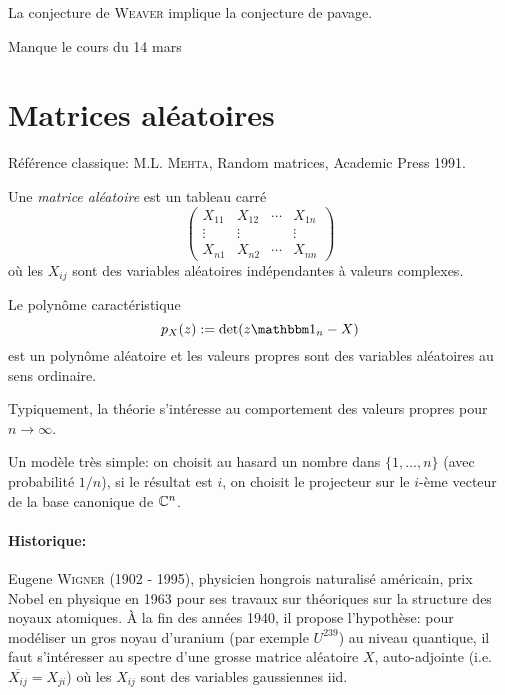 \begin{prop}
  La conjecture de \textsc{Weaver} implique la conjecture de pavage.
\end{prop}



{\LARGE Manque le cours du 14 mars}


\section{Matrices aléatoires}
\label{sec:matrices-aleatoires}

Référence classique: M.L. \textsc{Mehta}, Random matrices, Academic Press 1991.

\begin{defi}
  Une \emph{matrice aléatoire} est un tableau carré 
  \[ \begin{pmatrix}
      X_{11} & X_{12} & \cdots & X_{1n} \\
      \vdots & \vdots & & \vdots  \\
      X_{n1} & X_{n2} & \cdots & X_{nn}
    \end{pmatrix} \]
  où les $X_{ij}$ sont des variables aléatoires indépendantes à valeurs complexes.

  Le polynôme caractéristique 
  \[ p_X(z) := \det(z \un_n - X) \]
  est un polynôme aléatoire et les valeurs propres sont des variables aléatoires au sens ordinaire.
\end{defi}

Typiquement, la théorie s'intéresse au comportement des valeurs propres pour $n \to \infty$.


\begin{ex}
Un modèle très simple: on choisit au hasard un nombre dans $\{1, \ldots, n\}$ (avec probabilité $1/n$), si le
résultat est $i$, on choisit le projecteur sur le $i$-ème vecteur de la base canonique de $\mathbb{C}^n$.
\end{ex}

\paragraph{Historique:} Eugene \textsc{Wigner} (1902 - 1995), physicien hongrois naturalisé américain, prix
Nobel en physique en 1963 pour ses travaux sur théoriques sur la structure des noyaux atomiques. À la fin des
années 1940, il propose l'hypothèse: pour modéliser un gros noyau d'uranium (par exemple $U^{239}$) au niveau
quantique, il faut s'intéresser au spectre d'une grosse matrice aléatoire $X$, auto-adjointe
(i.e. $\overline{X_{ij}} = X_{ji}$) où les $X_{ij}$ sont des variables gaussiennes iid.


